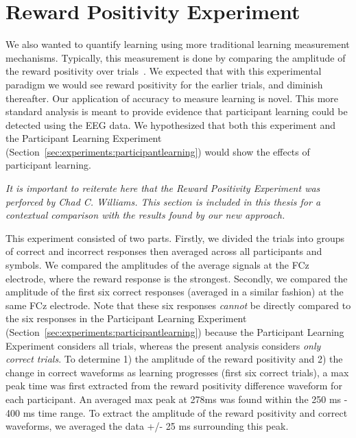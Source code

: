 \section{Reward Positivity Experiment}
\label{sec:experiments:rewpos}
We also wanted to quantify learning using more traditional learning measurement 
mechanisms. Typically, this measurement is done by comparing the amplitude of 
the reward positivity over trials~\cite{williams2017application}. We expected 
that with this experimental paradigm we would see reward positivity for the 
earlier trials, and diminish thereafter. Our application of \tvt accuracy to 
measure learning is novel.  This more standard analysis is meant to provide 
evidence that participant learning could be detected using the EEG data. We 
hypothesized that both this experiment and the Participant Learning Experiment 
(Section~\ref{sec:experiments:participantlearning}) would show the effects of 
participant learning.

\emph{It is important to reiterate here that the Reward Positivity Experiment 
was perforced by Chad C. Williams. This section is included in this thesis for 
a contextual comparison with the results found by our new approach.}

This experiment consisted of two parts. Firstly, we divided the trials into 
groups of correct and incorrect responses then averaged across all participants 
and symbols. We compared the amplitudes of the average signals at the FCz 
electrode, where the reward response is the strongest. Secondly, we compared 
the amplitude of the first six correct responses (averaged in a similar 
fashion) at the same FCz electrode. Note that these six responses \emph{cannot} 
be directly compared to the six responses in the Participant Learning 
Experiment (Section~\ref{sec:experiments:participantlearning}) because the 
Participant Learning Experiment considers all trials, whereas the present 
analysis considers \emph{only correct trials}. To determine 1) the amplitude of 
the reward positivity and 2) the change in correct waveforms as learning 
progresses (first six correct trials), a max peak time was first extracted from 
the reward positivity difference waveform for each participant. An averaged max 
peak at 278ms was found within the 250 ms - 400 ms time range. To extract the 
amplitude of the reward positivity and correct waveforms, we  averaged the data 
+/- 25 ms surrounding this peak.
